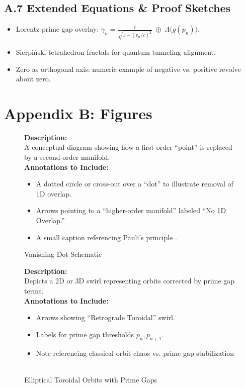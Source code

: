 \documentclass[11pt]{article}
\begin{document}
\subsection{A.7 Extended Equations \& Proof Sketches}
\begin{itemize}
    \item Lorentz prime gap overlay: \(\gamma_n = \frac{1}{\sqrt{1-(v_n/c)^2}} \;\oplus\; \Lambda\bigl(g(p_n)\bigr).\)
    \item Sierpi\'nski tetrahedron fractals for quantum tunneling alignment.
    \item Zero as orthogonal axis: numeric example of negative vs. positive revolve about zero.
\end{itemize}

\clearpage

\section{Appendix B: Figures}
\label{appendixb}

\begin{figure}[p]
\caption{Vanishing Dot Schematic}
\label{fig:vanishDot}
\textbf{Description:}\\
A conceptual diagram showing how a first-order “point” is replaced by a second-order manifold.\\[0.5em]
\textbf{Annotations to Include:}
\begin{itemize}
    \item A dotted circle or cross-out over a “dot” to illustrate removal of 1D overlap.
    \item Arrows pointing to a “higher-order manifold” labeled “No 1D Overlap.”
    \item A small caption referencing Pauli’s principle \cite{Pauli1925}.
\end{itemize}
\end{figure}

\begin{figure}[p]
\caption{Elliptical Toroidal Orbits with Prime Gaps}
\label{fig:ellipticalOrbits}
\textbf{Description:}\\
Depicts a 2D or 3D swirl representing orbits corrected by prime gap terms.\\[0.5em]
\textbf{Annotations to Include:}
\begin{itemize}
    \item Arrows showing “Retrograde Toroidal” swirl.
    \item Labels for prime gap thresholds $p_n, p_{n+1}$.
    \item Note referencing classical orbit chaos vs. prime gap stabilization \cite{Poincare1892}.
\end{itemize}
\end{figure}
\end{document}
